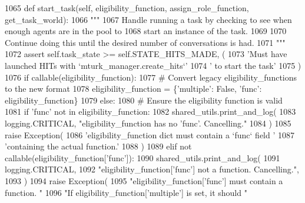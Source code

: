 \begin{DoxyCode}
1065     \textcolor{keyword}{def }start\_task(self, eligibility\_function, assign\_role\_function, get\_task\_world):
1066         \textcolor{stringliteral}{"""}
1067 \textcolor{stringliteral}{        Handle running a task by checking to see when enough agents are in the pool to}
1068 \textcolor{stringliteral}{        start an instance of the task.}
1069 \textcolor{stringliteral}{}
1070 \textcolor{stringliteral}{        Continue doing this until the desired number of conversations is had.}
1071 \textcolor{stringliteral}{        """}
1072         \textcolor{keyword}{assert} self.task\_state >= self.STATE\_HITS\_MADE, (
1073             \textcolor{stringliteral}{'Must have launched HITs with `mturk\_manager.create\_hits`'}
1074             \textcolor{stringliteral}{' to start the task'}
1075         )
1076         \textcolor{keywordflow}{if} callable(eligibility\_function):
1077             \textcolor{comment}{# Convert legacy eligibility\_functions to the new format}
1078             eligibility\_function = \{\textcolor{stringliteral}{'multiple'}: \textcolor{keyword}{False}, \textcolor{stringliteral}{'func'}: eligibility\_function\}
1079         \textcolor{keywordflow}{else}:
1080             \textcolor{comment}{# Ensure the eligibility function is valid}
1081             \textcolor{keywordflow}{if} \textcolor{stringliteral}{'func'} \textcolor{keywordflow}{not} \textcolor{keywordflow}{in} eligibility\_function:
1082                 shared\_utils.print\_and\_log(
1083                     logging.CRITICAL, \textcolor{stringliteral}{"eligibility\_function has no 'func'. Cancelling."}
1084                 )
1085                 \textcolor{keywordflow}{raise} Exception(
1086                     \textcolor{stringliteral}{'eligibility\_function dict must contain a `func` field '}
1087                     \textcolor{stringliteral}{'containing the actual function.'}
1088                 )
1089             \textcolor{keywordflow}{elif} \textcolor{keywordflow}{not} callable(eligibility\_function[\textcolor{stringliteral}{'func'}]):
1090                 shared\_utils.print\_and\_log(
1091                     logging.CRITICAL,
1092                     \textcolor{stringliteral}{"eligibility\_function['func'] not a function. Cancelling."},
1093                 )
1094                 \textcolor{keywordflow}{raise} Exception(
1095                     \textcolor{stringliteral}{"eligibility\_function['func'] must contain a function. "}
1096                     \textcolor{stringliteral}{"If eligibility\_function['multiple'] is set, it should "}

\end{DoxyCode}
